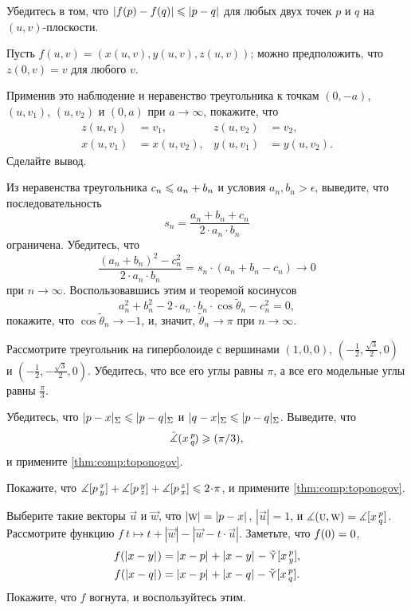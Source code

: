 Убедитесь в том, что $|f(p)-f(q)|\z\le |p-q|$ для любых двух точек $p$ и $q$ на $(u,v)$-плоскости.

Пусть $f(u,v)=(x(u,v),y(u,v),z(u,v))$;
можно предположить, что $z(0,v)=v$ для любого $v$.

Применив это наблюдение и неравенство треугольника к точкам $(0,-a)$, $(u,v_1)$, $(u,v_2)$ и $(0,a)$ при $a\to \infty$, покажите, что 
\begin{align*}
z(u,v_1)&=v_1,
&
z(u,v_2)&=v_2,
\\
x(u,v_1)&=x(u,v_2),
&
y(u,v_1)&=y(u,v_2).
\end{align*}
Сделайте вывод.



\setcounter{eqtn}{0}

Из неравенства треугольника $c_n\z\le a_n\z+b_n$ и условия $a_n,b_n>\epsilon$, выведите, что последовательность 
\[
s_n=\frac{a_n+b_n+c_n}{2\cdot a_n\cdot b_n}
\]
ограничена.
Убедитесь, что
\[
\frac{(a_n+b_n)^2-c_n^2}{2\cdot a_n\cdot b_n}=s_n\cdot (a_n+b_n-c_n)\to 0
\]
при $n\to\infty$.
Воспользовавшись этим и теоремой косинусов
\[
a_n^2+b_n^2-2\cdot a_n\cdot b_n\cdot\cos\tilde\theta_n -c_n^2=0,
\]
покажите, что $\cos\tilde\theta_n\to -1$, и, значит, $\tilde\theta_n\to \pi$ при $n\to\infty$.

Рассмотрите треугольник на гиперболоиде с вершинами $(1,0,0)$, $(-\tfrac12, \tfrac{\sqrt{3}}2,0)$ и $(-\tfrac12,-\tfrac{\sqrt{3}}2,0)$.
Убедитесь, что все его углы равны $\pi$, а все его модельные углы равны $\tfrac{\pi}3$.

Убедитесь, что $\dist{p}{x}\Sigma\le \dist{p}{q}\Sigma$ и $\dist{q}{x}\Sigma\le \dist{p}{q}\Sigma$.
Выведите, что
\[\tilde\measuredangle(x\,{}^{p}_{q}\hspace{-0.2ex})\geqslant (\pi/3),\]
и примените \ref{thm:comp:toponogov}.

Покажите, что 
$\measuredangle\hinge pxy+\measuredangle\hinge pyz+\measuredangle\hinge pzx\z\le2\cdot \pi$,
и примените \ref{thm:comp:toponogov}.

Выберите такие векторы $\vec u$ и $\vec w$, что $|\vec w|\z=\dist{p}{x}{}$, $|\vec u|=1$, и $\measuredangle(\text{\sc{u}},\text{\sc{w}})=\measuredangle[x\,{}^{p}_{q}]$.
Рассмотрите функцию
$f\:t\mapsto t+|\vec w|-|\vec w-t\cdot \vec u|$.
Заметьте, что $f(0)\z=0$,
\begin{align*}
f(\dist{x}{y}{})&=\dist{x}{p}{}+\dist{x}{y}{}-\side\hinge xpy,
\\
f(\dist{x}{q}{})&=\dist{x}{p}{}+\dist{x}{q}{}-\side\hinge xpq.
\end{align*}
Покажите, что $f$ вогнута, и воспользуйтесь этим.

